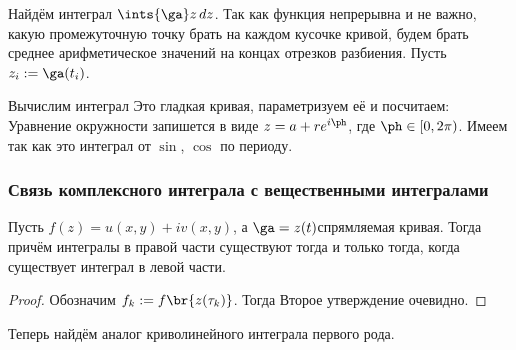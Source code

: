 \documentclass[a4paper]{article}
\begin{document}
\begin{solution}
\begin{ex}
Найдём интеграл $\ints{\ga}z\,dz$.
Так как функция непрерывна и не важно, какую промежуточную точку брать на каждом кусочке кривой, будем брать среднее
арифметическое значений на концах отрезков разбиения. Пусть $z_i := \ga(t_i)$.
\end{ex}

\begin{ex}
Вычислим интеграл
Это гладкая кривая, параметризуем её и посчитаем: Уравнение окружности запишется в виде
$z = a + re^{i\ph}$, где $\ph \in [0, 2\pi)$. Имеем
так как это интеграл от $\sin$, $\cos$ по периоду.
\end{ex}

\subsubsection{Связь комплексного интеграла с вещественными интегралами}

\begin{stm}
Пусть $f(z) = u(x,y) + i v(x,y)$, а $\ga = z(t)$\т спрямляемая кривая.
Тогда
причём интегралы в правой части существуют тогда и только тогда, когда существует интеграл в левой части.
\end{stm}
\begin{proof}
Обозначим $f_k := f\br{z(\tau_k)}$. Тогда
Второе утверждение очевидно.
\end{proof}

Теперь найдём аналог криволинейного интеграла первого рода.

\begin{df}
\end{df}


\end{solution}
\end{document}
